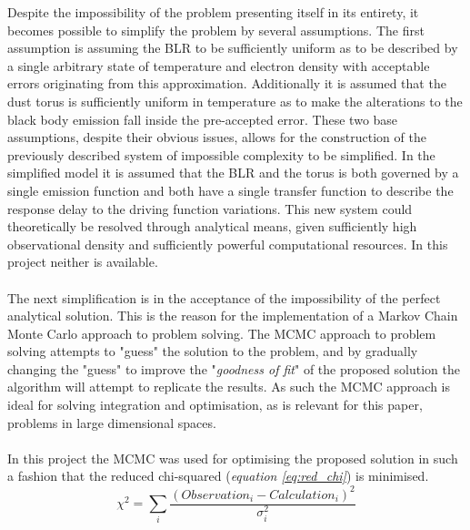\documentclass[a4paper, 12pt, twoside]{article}
\begin{document}
Despite the impossibility of the problem presenting itself in its entirety, it becomes possible to simplify the problem by several assumptions. The first assumption is assuming the BLR to be sufficiently uniform as to be described by a single arbitrary state of temperature and electron density with acceptable errors originating from this approximation. Additionally it is assumed that the dust torus is sufficiently uniform in temperature as to make the alterations to the black body emission fall inside the pre-accepted error. These two base assumptions, despite their obvious issues, allows for the construction of the previously described system of impossible complexity to be simplified. In the simplified model it is assumed that the BLR and the torus is both governed by a single emission function and both have a single transfer function to describe the response delay to the driving function variations. This new system could theoretically be resolved through analytical means, given sufficiently high observational density and sufficiently powerful computational resources. In this project neither is available. \\
\\
The next simplification is in the acceptance of the impossibility of the perfect analytical solution. This is the reason for the implementation of a Markov Chain Monte Carlo approach to problem solving. The MCMC approach to problem solving attempts to "guess" the solution to the problem, and by gradually changing the "guess" to improve the "\emph{goodness of fit}" of the proposed solution the algorithm will attempt to replicate the results. As such the MCMC approach is ideal for solving integration and optimisation, as is relevant for this paper, problems in large dimensional spaces.\\
\\
In this project the MCMC was used for optimising the proposed solution in such a fashion that the reduced chi-squared (\emph{equation \ref{eq:red_chi}}) is minimised.
\begin{equation}
\chi^{2} = \sum_{i} \frac{(Observation_{i} - Calculation_{i})^{2}}{\sigma_{i}^{2}}
\label{eq:red_chi}
\end{equation}
\end{document}
